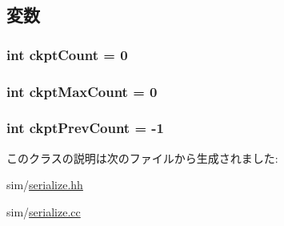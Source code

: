 \subsection{変数}
\hypertarget{classSerializable_ad9584d823bbe23fb3371f48784a2f006}{
\subsubsection[{ckptCount}]{\setlength{\rightskip}{0pt plus 5cm}int {\bf ckptCount} = 0}}
\label{classSerializable_ad9584d823bbe23fb3371f48784a2f006}
\hypertarget{classSerializable_ad24cc9cedf2420163221d12e446590e0}{
\subsubsection[{ckptMaxCount}]{\setlength{\rightskip}{0pt plus 5cm}int {\bf ckptMaxCount} = 0}}
\label{classSerializable_ad24cc9cedf2420163221d12e446590e0}
\hypertarget{classSerializable_aea546c19c209316cc2c1565550701211}{
\subsubsection[{ckptPrevCount}]{\setlength{\rightskip}{0pt plus 5cm}int {\bf ckptPrevCount} = -\/1}}
\label{classSerializable_aea546c19c209316cc2c1565550701211}


このクラスの説明は次のファイルから生成されました:\begin{DoxyCompactItemize}
\item 
sim/\hyperlink{serialize_8hh}{serialize.hh}\item 
sim/\hyperlink{serialize_8cc}{serialize.cc}\end{DoxyCompactItemize}
